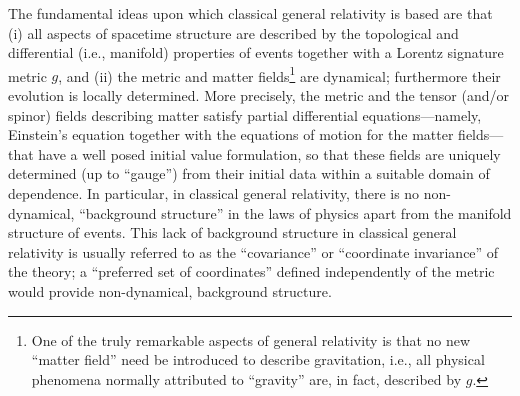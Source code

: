 \documentclass[12pt]{article}
\theoremstyle{plain}
\theoremstyle{definition}
\begin{document}
The fundamental ideas upon which classical general relativity is based are that (i) all aspects of spacetime structure are described by the  topological and differential (i.e., manifold) properties of events together with a Lorentz signature metric $g$, and (ii) the metric and matter fields\footnote{One of the truly remarkable aspects of general relativity is that no new ``matter field'' need be introduced to describe gravitation, i.e., all physical phenomena normally attributed to ``gravity'' are, in fact, described by $g$.} are dynamical; furthermore their evolution is locally determined. More precisely, the metric and the tensor (and/or spinor) fields describing matter satisfy partial differential equations---namely, Einstein's equation together with the equations of motion for the matter fields---that have a well posed initial value formulation, so that these fields are uniquely determined (up to ``gauge'') from their initial data within a suitable domain of dependence. In particular, in classical general relativity, there is no non-dynamical, ``background structure'' in the laws of physics apart from the manifold structure of events. This lack of background structure in classical general relativity is usually referred to as the ``covariance'' or ``coordinate invariance'' of the theory; a ``preferred set of coordinates'' defined independently of the metric would provide non-dynamical, background structure.
\end{document}
